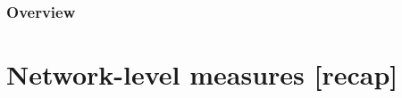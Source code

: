 \documentclass[8pt]{beamer}
\begin{document}
\begin{frame}
\frametitle{Overview}
\tableofcontents[hideallsubsections]
\end{frame}







\section{Network-level measures [recap]}

\bgroup
{}
\begin{frame}[plain]{}
\begin{center}
\color{white}{\Huge\insertsection}
\end{center}
\end{frame}
\egroup

\end{document}
